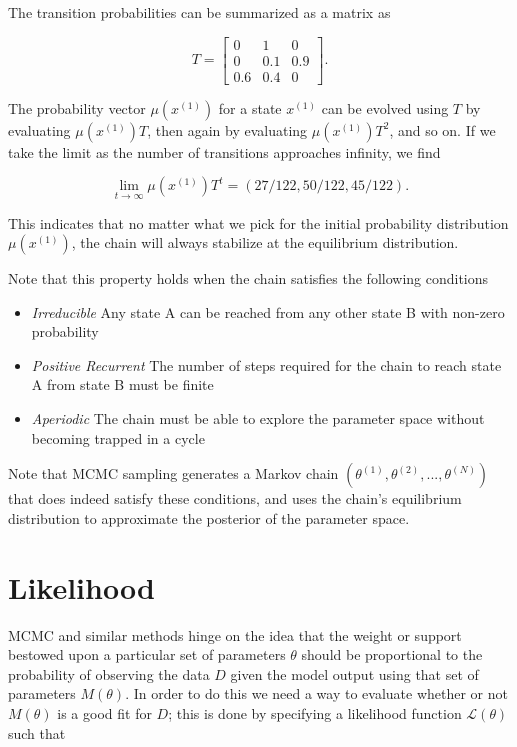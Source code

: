 \documentclass[12pt]{article}
\begin{document}
    The transition probabilities can be summarized as a matrix as

    $$
    T = 
    \begin{bmatrix}
        0 & 1 & 0 \\
        0 & 0.1 & 0.9 \\
        0.6 & 0.4 & 0
    \end{bmatrix}.
    $$

    The probability vector $\mu(x^{(1)})$ for a state $x^{(1)}$ can be evolved using $T$ by evaluating $\mu(x^{(1)})T$, then again by evaluating $\mu(x^{(1)})T^2$, and so on. If we take the limit as the number of transitions approaches infinity, we find

    $$
        \lim_{t \to \infty} \mu(x^{(1)})T^t = (27/122, 50/122, 45/122).
    $$

    This indicates that no matter what we pick for the initial probability distribution $\mu(x^{(1)})$, the chain will always stabilize at the equilibrium distribution.

    Note that this property holds when the chain satisfies the following conditions

    \begin{itemize}
        \item \textit{Irreducible} Any state A can be reached from any other state B with non-zero probability
        \item \textit{Positive Recurrent} The number of steps required for the chain to reach state A from state B must be finite
        \item \textit{Aperiodic} The chain must be able to explore the parameter space without becoming trapped in a cycle
    \end{itemize}

    Note that MCMC sampling generates a Markov chain $(\theta^{(1)}, \theta^{(2)},..., \theta^{(N)})$ that does indeed satisfy these conditions, and uses the chain's equilibrium distribution to approximate the posterior of the parameter space.    


\section{Likelihood}

    MCMC and similar methods hinge on the idea that the weight or support bestowed upon a particular set of parameters $\theta$ should be proportional to the probability of observing the data $D$ given the model output using that set of parameters $M(\theta)$. In order to do this we need a way to evaluate whether or not $M(\theta)$ is a good fit for $D$; this is done by specifying a likelihood function $\mathcal{L}(\theta)$ such that
\end{document}
